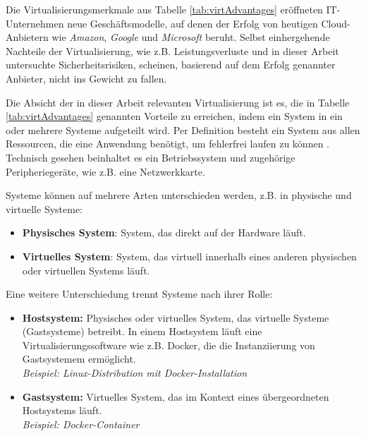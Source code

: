 \documentclass[../main.tex]{subfiles}
\begin{document}
		Die Virtualisierungsmerkmale aus Tabelle \ref{tab:virtAdvantages} eröffneten IT-Unternehmen neue Geschäftsmodelle, auf denen der Erfolg von heutigen Cloud-Anbietern wie \emph{Amazon}, \emph{Google} und \emph{Microsoft} beruht. Selbst einhergehende Nachteile der Virtualisierung, wie z.B. Leistungsverluste und in dieser Arbeit untersuchte Sicherheitsrisiken, scheinen, basierend auf dem Erfolg genannter Anbieter, nicht ins Gewicht zu fallen.


		Die Absicht der in dieser Arbeit relevanten Virtualisierung ist es, die in Tabelle \ref{tab:virtAdvantages} genannten Vorteile zu erreichen, indem ein System in ein oder mehrere Systeme aufgeteilt wird. Per Definition besteht ein System aus allen Ressourcen, die eine Anwendung benötigt, um fehlerfrei laufen zu können \cite[S.106]{tanenbaumOS}. Technisch gesehen beinhaltet es ein Betriebssystem und zugehörige Peripheriegeräte, wie z.B. eine Netzwerkkarte.

		Systeme können auf mehrere Arten unterschieden werden, z.B. in physische und virtuelle Systeme:

		\begin{itemize}
			\item \textbf{Physisches System}: System, das direkt auf der Hardware läuft.
			\item \textbf{Virtuelles System}: System, das virtuell innerhalb eines anderen physischen oder virtuellen Systems läuft.
		\end{itemize}

		Eine weitere Unterschiedung trennt Systeme nach ihrer Rolle:

		\begin{itemize}
			\item \textbf{Hostsystem:} Physisches oder virtuelles System, das virtuelle Systeme (Gastsysteme) betreibt. In einem Hostsystem läuft eine Virtualisierungssoftware wie z.B. Docker, die die Instanziierung von Gastsystemem ermöglicht.\\
			\emph{Beispiel: Linux-Distribution mit Docker-Installation}
			\item \textbf{Gastsystem:} Virtuelles System, das im Kontext eines übergeordneten Hostsystems läuft.\\
			\emph{Beispiel: Docker-Container}
		\end{itemize}
\end{document}

